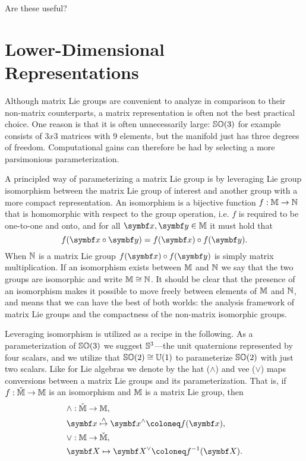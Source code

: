 Are these useful?


\section{Lower-Dimensional Representations}

Although matrix Lie groups are convenient to analyze in comparison to their non-matrix counterparts, a matrix representation is often not the best practical choice. One reason is that it is often unnecessarily large: ${\mathbb{SO}(3)}$ for example consists of $3x3$ matrices with 9 elements, but the manifold just has three degrees of freedom. Computational gains can therefore be had by selecting a more parsimonious parameterization.

A principled way of parameterizing a matrix Lie group is by leveraging Lie group isomorphism between the matrix Lie group of interest and another group with a more compact representation. An isomorphism is a bijective function $f : {\mathbb{M}} \rightarrow {\mathbb{N}}$ that is homomorphic with respect to the group operation, i.e. $f$ is required to be one-to-one and onto, and for all $\x, \y \in \M$ it must hold that
\begin{equation}
  f(\x \circ \y) = f(\x) \circ f(\y).
\end{equation}
When ${\mathbb{N}}$ is a matrix Lie group $f(\x) \circ f(\y)$ is simply matrix multiplication. If an isomorphism exists between ${\mathbb{M}}$ and ${\mathbb{N}}$ we say that the two groups are isomorphic and write ${\mathbb{M}} \cong {\mathbb{N}}$. It should be clear that the presence of an isomorphism makes it possible to move freely between elements of ${\mathbb{M}}$ and ${\mathbb{N}}$, and means that we can have the best of both worlds: the analysis framework of matrix Lie groups and the compactness of the non-matrix isomorphic groups.

Leveraging isomorphism is utilized as a recipe in the following. As a parameterization of ${\mathbb{SO}(3)}$ we suggest ${\mathbb{S}^3}$---the unit quaternions represented by four scalars, and we utilize that ${\mathbb{SO}(2)} \cong {\mathbb{U}(1)}$ to parameterize ${\mathbb{SO}(2)}$ with just two scalars. Like for Lie algebras we denote by the hat ($\wedge$) and vee ($\vee$) maps conversions between a matrix Lie groups and its parameterization. That is, if $f : \check {{\mathbb{M}}} \rightarrow {\mathbb{M}}$ is an isomorphism and ${\mathbb{M}}$ is a matrix Lie group, then
\begin{equation}
  \begin{aligned}
    & \wedge: \check \M \rightarrow \M, \\
    & \x \overset{\wedge}{\mapsto} \x^\wedge \coloneq f(\x), \\
    & \vee: \M \rightarrow \check \M, \\
    & \X \mapsto \X^\vee \coloneq f^{-1}(\X).
  \end{aligned}
\end{equation}

